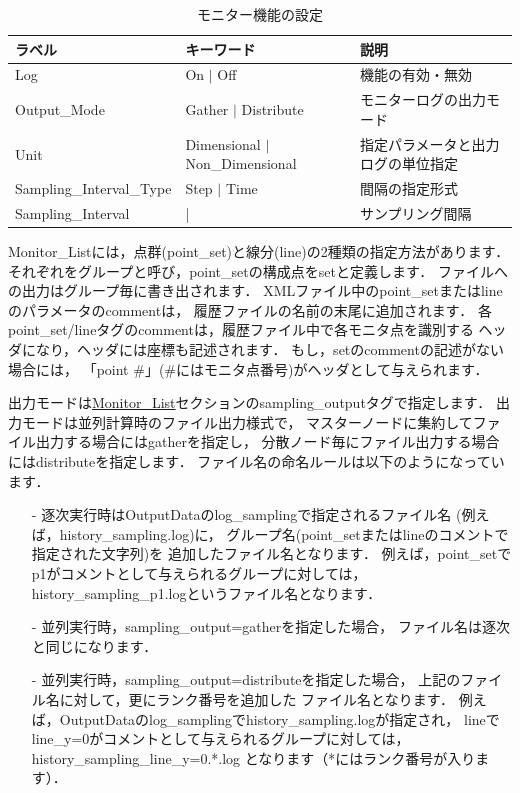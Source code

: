 \begin{table}[htdp]
\caption{モニター機能の設定}
\begin{center}
\small
\begin{tabular}{lll}\toprule
ラベル & キーワード & 説明\\\midrule
Log & On $|$ Off & 機能の有効・無効\\
Output\_Mode & Gather $|$ Distribute & モニターログの出力モード\\
Unit & Dimensional $|$ Non\_Dimensional & 指定パラメータと出力ログの単位指定\\
Sampling\_Interval\_Type & Step $|$ Time & 間隔の指定形式\\
Sampling\_Interval & | & サンプリング間隔\\
\bottomrule
\end{tabular}
\end{center}
\label{tbl:outline of monitor}
\end{table}


Monitor\_Listには，点群(point\_set)と線分(line)の2種類の指定方法があります．
それぞれをグループと呼び，point\_setの構成点をsetと定義します．
ファイルへの出力はグループ毎に書き出されます．
XMLファイル中のpoint\_setまたはlineのパラメータのcommentは，
履歴ファイルの名前の末尾に追加されます．
各point\_set/lineタグのcommentは，履歴ファイル中で各モニタ点を識別する
ヘッダになり，ヘッダには座標も記述されます．
もし，setのcommentの記述がない場合には，
「point \#」(\#にはモニタ点番号)がヘッダとして与えられます． 


出力モードは\hyperlink{tgt:monitor_list}{Monitor\_List}セクションのsampling\_outputタグで指定します．
出力モードは並列計算時のファイル出力様式で，
マスターノードに集約してファイル出力する場合にはgatherを指定し，
分散ノード毎にファイル出力する場合にはdistributeを指定します．
ファイル名の命名ルールは以下のようになっています．
\begin{itemize}
\item[-] 逐次実行時はOutputDataのlog\_samplingで指定されるファイル名
(例えば，history\_sampling.log)に，
グループ名(point\_setまたはlineのコメントで指定された文字列)を
追加したファイル名となります．
例えば，point\_setでp1がコメントとして与えられるグループに対しては，
history\_sampling\_p1.logというファイル名となります．
\item[-] 並列実行時，sampling\_output=gatherを指定した場合，
ファイル名は逐次と同じになります．
\item[-] 並列実行時，sampling\_output=distributeを指定した場合，
上記のファイル名に対して，更にランク番号を追加した ファイル名となります．
例えば，OutputDataのlog\_samplingでhistory\_sampling.logが指定され，
lineでline\_y=0がコメントとして与えられるグループに対しては，
history\_sampling\_line\_y=0.*.log となります（*にはランク番号が入ります）． 
\end{itemize}

